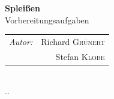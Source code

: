 \documentclass[12pt]{article}
\begin{document}
\begin{titlepage}

{ \huge \bfseries Spleißen}\\ %
\vspace{0.034441853748633004\paperheight}
\large Vorbereitungsaufgaben \\
\vspace{0.1458980337503154\paperheight}


  \begin{tabular}{lr}
    \emph{Autor:} & Richard {\color{hsblue}\textsc{Grünert}}\\
                       & Stefan {\color{hsblue}\textsc{Klobe}}
   \end{tabular}\\[0.05572809000084118\paperheight]

{\large {\the\day.\the\month.\the\year}}\\




\vfill %

\end{titlepage}
\end{document}

